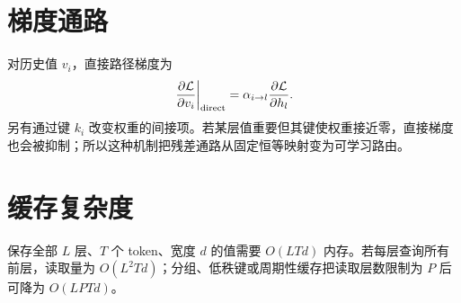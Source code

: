\documentclass[11pt]{article}
\numberwithin{equation}{section}
\newcommand{\1}{\mathbf{1}}
\newcommand{\cL}{\mathcal{L}}
\begin{document}
\section{梯度通路}
对历史值 $v_i$，直接路径梯度为
\begin{equation}
  \left.\frac{\partial\cL}{\partial v_i}\right|_{\rm direct}
  =\alpha_{i\to l}\frac{\partial\cL}{\partial h_l}.
\end{equation}
另有通过键 $k_i$ 改变权重的间接项。若某层值重要但其键使权重接近零，直接梯度也会被抑制；所以这种机制把残差通路从固定恒等映射变为可学习路由。

\section{缓存复杂度}
保存全部 $L$ 层、$T$ 个 token、宽度 $d$ 的值需要 $O(LTd)$ 内存。若每层查询所有前层，读取量为 $O(L^2Td)$；分组、低秩键或周期性缓存把读取层数限制为 $P$ 后可降为 $O(LPTd)$。
\end{document}
